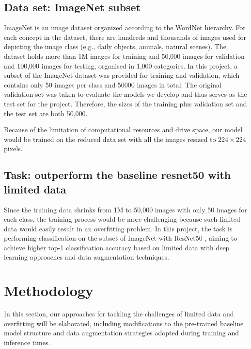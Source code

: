 \documentclass{article}
\begin{document}
\subsection{Data set: ImageNet subset}
ImageNet \cite{deng2009imagenet} is an image dataset organized according to the WordNet \cite{Miller1995} hierarchy. For each concept in the dataset, there are hundreds and thousands of images used for depicting the image class (e.g., daily objects, animals, natural scenes). The dataset holds more than 1M images for training and 50,000 images for validation and 100,000 images for testing, organised in 1,000 categories. In this project, a subset \cite{kayhan2020translation} of the ImageNet dataset was provided for training and validation, which contains only 50 images per class and 50000 images in total. The original validation set was taken to evaluate the models we develop and thus serves as the test set for the project. Therefore, the sizes of the training plus validation set and the test set are both 50,000. 

Because of the limitation of computational resources and drive space, our model would be trained on the reduced data set with all the images resized to $224 \times 224$ pixels. 

\subsection{Task: outperform the baseline resnet50 with limited data}
Since the training data shrinks from 1M to 50,000 images with only 50 images for each class, the training process would be more challenging because such limited data would easily result in an overfitting problem. In this project, the task is performing classification on the subset of ImageNet with ResNet50 \cite{he2016deep}, aiming to achieve higher top-1 classification accuracy based on limited data with deep learning approaches and data augmentation techniques.

\section{Methodology}
\label{sec:methodology}
In this section, our approaches for tackling the challenges of limited data and overfitting will be elaborated, including modifications to the pre-trained baseline model structure and data augmentation strategies adopted during training and inference times. 
\end{document}
